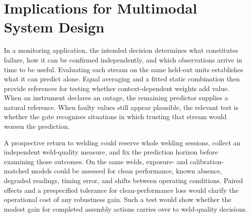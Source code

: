 \section{Implications for Multimodal System Design}
In a monitoring application, the intended decision determines what constitutes failure,
how it can be confirmed independently, and which observations arrive in time to be
useful. Evaluating each stream on the same held-out units establishes what it can
predict alone. Equal averaging and a fitted static combination then provide references
for testing whether context-dependent weights add value. When an instrument declares an
outage, the remaining predictor supplies a natural reference. When faulty values still
appear plausible, the relevant test is whether the gate recognises situations in which
trusting that stream would worsen the prediction.

A prospective return to welding could reserve whole welding sessions, collect an
independent weld-quality measure, and fix the prediction horizon before examining those
outcomes. On the same welds, exposure- and calibration-matched models could be assessed
for clean performance, known absence, degraded readings, timing error, and shifts
between operating conditions. Paired effects and a prespecified tolerance for
clean-performance loss would clarify the operational cost of any robustness gain. Such a
test would show whether the modest gain for completed assembly actions carries over to
weld-quality decisions.
